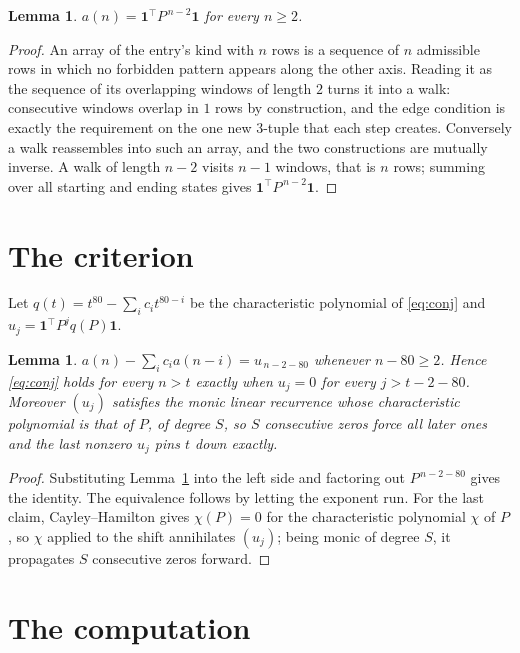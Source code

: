 \documentclass[11pt,a4paper]{article}
\theoremstyle{plain}
\newtheorem{lemma}[theorem]{Lemma}
\theoremstyle{definition}
\begin{document}
\begin{lemma}\label{lem:walk}
$a(n)=\mathbf{1}^{\!\top}P^{\,n-2}\mathbf{1}$ for every $n\ge2$.
\end{lemma}

\begin{proof}
An array of the entry's kind with $n$ rows is a sequence of $n$ admissible rows in
which no forbidden pattern appears along the other axis. Reading it as the sequence of its
overlapping windows of length $2$ turns it into a walk: consecutive windows overlap in
$1$ rows by construction, and the edge condition is exactly the requirement on the one
new $3$-tuple that each step creates. Conversely a walk reassembles into such an array,
and the two constructions are mutually inverse. A walk of length $n-2$ visits $n-1$
windows, that is $n$ rows; summing over all starting and ending states gives
$\mathbf{1}^{\!\top}P^{\,n-2}\mathbf{1}$.
\end{proof}

\section{The criterion}

Let $q(t)=t^{80}-\sum_i c_i t^{80-i}$ be the characteristic polynomial of
\eqref{eq:conj} and $u_j=\mathbf{1}^{\!\top}P^{j}q(P)\mathbf{1}$.

\begin{lemma}\label{lem:crit}
$a(n)-\sum_i c_i a(n-i)=u_{\,n-2-80}$ whenever $n-80\ge2$. Hence
\eqref{eq:conj} holds for every $n>t$ exactly when $u_j=0$ for every
$j>t-2-80$. Moreover $(u_j)$ satisfies the monic linear recurrence whose
characteristic polynomial is that of $P$, of degree $S$, so $S$ consecutive zeros force all
later ones and the last nonzero $u_j$ pins $t$ down exactly.
\end{lemma}

\begin{proof}
Substituting Lemma~\ref{lem:walk} into the left side and factoring out
$P^{\,n-2-80}$ gives the identity. The equivalence follows by letting the exponent
run. For the last claim, Cayley--Hamilton gives $\chi(P)=0$ for the characteristic
polynomial $\chi$ of $P$, so $\chi$ applied to the shift annihilates $(u_j)$; being monic of
degree $S$, it propagates $S$ consecutive zeros forward.
\end{proof}

\section{The computation}
\end{document}
